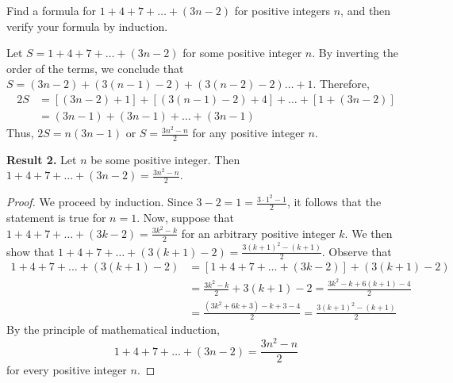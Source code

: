 \documentclass[12pt]{article}
\newenvironment{problem}[2][Problem]{\begin{trivlist}
		\item[\hskip \labelsep {\bfseries #1}\hskip \labelsep {\bfseries #2.}]}{\end{trivlist}}
\newenvironment{solution}[2][Solution]{\begin{trivlist}
		\item[\hskip \labelsep {\bfseries #1}\hskip \labelsep {\bfseries #2.}]}{\end{trivlist}}
\begin{document}
\begin{problem}{8}
	Find a formula for $1+4+7+\ldots+(3n-2)$ for positive integers $n$, and then verify your formula by induction.
	\begin{solution}{}
		Let $S=1+4+7+\ldots+(3n-2)$ for some positive integer $n$. By inverting the order of the terms, we conclude that $S=(3n-2)+(3(n-1)-2)+(3(n-2)-2)\ldots+1$. Therefore,
		\begin{align*}
			2S &= [(3n-2)+1]+[(3(n-1)-2)+4]+\ldots+[1+(3n-2)]\\
			&= (3n-1)+(3n-1)+\ldots+(3n-1)
		\end{align*}
		Thus, $2S = n(3n-1)$ or $S=\frac{3n^{2}-n}{2}$ for any positive integer $n$.
		
		\textbf{Result 2.} Let $n$ be some positive integer. Then $1+4+7+\ldots+(3n-2)=\frac{3n^{2}-n}{2}$.
		\begin{proof}
			We proceed by induction. Since $3-2=1=\frac{3\cdot1^{2}-1}{2}$, it follows that the statement is true for $n=1$.
			Now, suppose that $1+4+7+\ldots+(3k-2)=\frac{3k^{2}-k}{2}$ for an arbitrary positive integer $k$. We then show that $1+4+7+\ldots+(3(k+1)-2)=\frac{3(k+1)^{2}-(k+1)}{2}$. Observe that
			\begin{align*}  
				1+4+7+\ldots+(3(k+1)-2) &= [1+4+7+\ldots+(3k-2)]+ (3(k+1)-2)\\
				&= \frac{3k^{2}-k}{2} + 3(k+1)-2 = \frac{3k^{2}-k+6(k+1)-4}{2}\\
				&= \frac{(3k^{2}+6k+3)-k+3-4}{2}=\frac{3(k+1)^{2}-(k+1)}{2}
			\end{align*}
		By the principle of mathematical induction,
		\begin{equation*}
			1+4+7+\ldots+(3n-2)=\frac{3n^{2}-n}{2}
		\end{equation*}
	for every positive integer $n$.
		\end{proof}
	\end{solution}
\end{problem}
\end{document}

